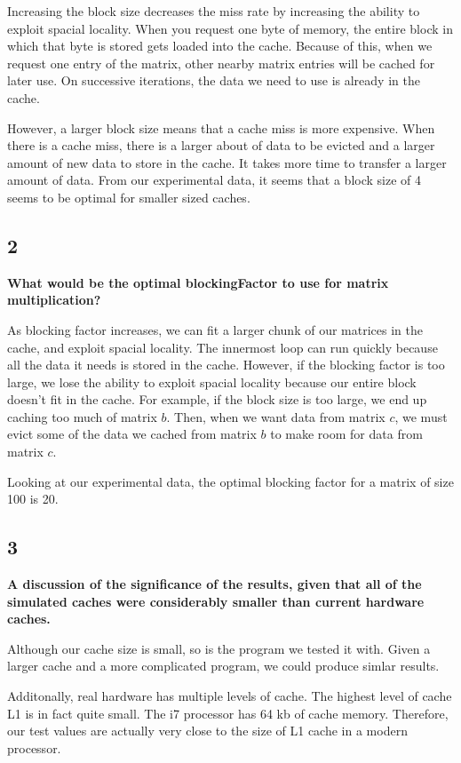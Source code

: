 \documentclass[letterpaper, 12pt, oneside]{memoir}
\begin{document}
Increasing the block size decreases the miss rate by increasing the ability to
exploit spacial locality. When you request one byte of memory, the
entire block in which that byte is stored gets loaded into the cache. Because 
of this, when we request one entry of the matrix, other nearby matrix entries
will be cached for later use. On successive iterations, the data we need to use
is already in the cache.

However, a larger block size means that a cache miss is more expensive. When
there is a cache miss, there is a larger about of data to be evicted and a
larger amount of new data to store in the cache. It takes more time to transfer
a larger amount of data. From our experimental data, it seems that a block size
of 4 seems to be optimal for smaller sized caches.


\subsection{2}
\textbf{What would be the optimal blockingFactor to use for matrix
multiplication?}

As blocking factor increases, we can fit a larger chunk of our matrices in the
cache, and exploit spacial locality. The innermost loop can run quickly because
all the data it needs is stored in the cache. However, if the blocking factor
is too large, we lose the ability to exploit spacial locality because our entire
block doesn't fit in the cache. For example, if the block size is too
large, we end up caching too much of matrix $b$. Then, when we want data from
matrix $c$, we must evict some of the data we cached from matrix $b$ to make
room for data from matrix $c$.

Looking at our experimental data, the optimal blocking factor for a matrix
of size 100 is 20.


\subsection{3}
\textbf{A discussion of the significance of the results, given that all of the
simulated caches were considerably smaller than current hardware caches.}

Although our cache size is small, so is the program we tested it with. Given a
larger cache and a more complicated program, we could produce simlar results.

Additonally, real hardware has multiple levels of cache. The highest level of
cache L1 is in fact quite small. The i7 processor has 64 kb of cache memory.
Therefore, our test values are actually very close to the size of L1 cache in 
a modern processor.
\end{document}
